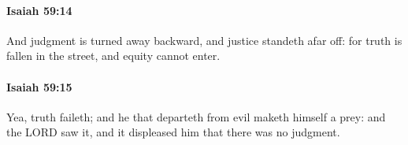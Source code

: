 		\paragraph{Isaiah 59:14} %
			\label{ISAIAH-59-14}

			And judgment is turned away backward, and justice standeth afar off: for truth is fallen in the street, and equity cannot enter.


		\paragraph{Isaiah 59:15} %
			\label{ISAIAH-59-15}

			Yea, truth faileth; and he that departeth from evil maketh himself a prey: and the LORD saw it, and it displeased him that there was no judgment.


